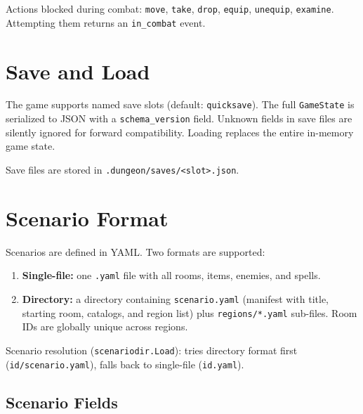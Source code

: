 \documentclass[a4paper,10pt]{article}
\newcommand{\cmd}[1]{\texttt{#1}}
\newcommand{\field}[1]{\texttt{#1}}
\begin{document}
Actions blocked during combat: \cmd{move}, \cmd{take}, \cmd{drop},
\cmd{equip}, \cmd{unequip}, \cmd{examine}. Attempting them returns an
\texttt{in\_combat} event.

\section{Save and Load}

The game supports named save slots (default: \texttt{quicksave}). The
full \texttt{GameState} is serialized to JSON with a \field{schema\_version}
field. Unknown fields in save files are silently ignored for forward
compatibility. Loading replaces the entire in-memory game state.

Save files are stored in \texttt{.dungeon/saves/<slot>.json}.

\section{Scenario Format}

Scenarios are defined in YAML. Two formats are supported:

\begin{enumerate}[nosep]
  \item \textbf{Single-file:} one \texttt{.yaml} file with all rooms,
        items, enemies, and spells.
  \item \textbf{Directory:} a directory containing \texttt{scenario.yaml}
        (manifest with title, starting room, catalogs, and region list)
        plus \texttt{regions/*.yaml} sub-files. Room IDs are globally
        unique across regions.
\end{enumerate}

Scenario resolution (\texttt{scenariodir.Load}): tries directory format
first (\texttt{id/scenario.yaml}), falls back to single-file
(\texttt{id.yaml}).

\subsection{Scenario Fields}
\end{document}

